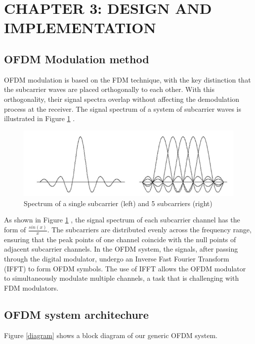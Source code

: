 \section*{CHAPTER 3:  DESIGN AND IMPLEMENTATION}
\setcounter{section}{3}
\setcounter{subsection}{0}
\setcounter{figure}{0}
\setcounter{table}{0}

\subsection{OFDM Modulation method}
OFDM modulation is based on the FDM technique, with the key distinction that the subcarrier waves are placed orthogonally to each other. With this orthogonality, their signal spectra overlap without affecting the demodulation process at the receiver. The signal spectrum of a system of subcarrier waves is illustrated in Figure \ref{Spectrum} \cite{b6}.

\begin{figure}[htbp]
    \centering
    \includegraphics[width=\textwidth]{Figures/Spectrum}
    \caption{Spectrum of a single subcarrier (left) and 5 subcarriers (right)}
    \label{Spectrum}
\end{figure}

As shown in Figure \ref{Spectrum} \cite{OFDM2010}, the signal spectrum of each subcarrier channel has the form of $\frac{sin(x)}{x}$. The subcarriers are distributed evenly across the frequency range, ensuring that the peak points of one channel coincide with the null points of adjacent subcarrier channels. In the OFDM system, the signals, after passing through the digital modulator, undergo an Inverse Fast Fourier Transform (IFFT) to form OFDM symbols. The use of IFFT allows the OFDM modulator to simultaneously modulate multiple channels, a task that is challenging with FDM modulators.

\subsection{OFDM system architechure}
Figure \ref{diagram} shows a block diagram of our generic OFDM system.

